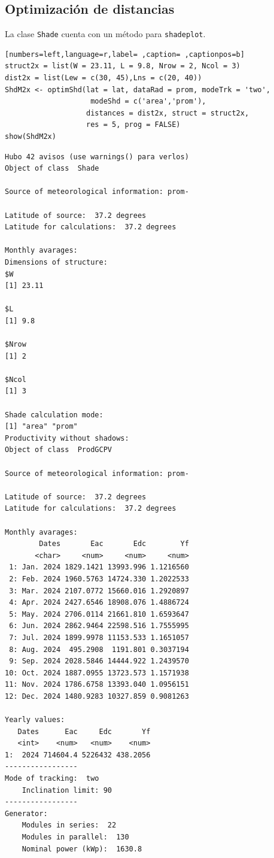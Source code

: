 \subsection{Optimización de distancias}
\label{sec:org7e88415}
La clase \texttt{Shade} cuenta con un método para \texttt{shadeplot}.
\begin{lstlisting}[numbers=left,language=r,label= ,caption= ,captionpos=b]
struct2x = list(W = 23.11, L = 9.8, Nrow = 2, Ncol = 3)
dist2x = list(Lew = c(30, 45),Lns = c(20, 40))
ShdM2x <- optimShd(lat = lat, dataRad = prom, modeTrk = 'two',
                    modeShd = c('area','prom'),
                   distances = dist2x, struct = struct2x,
                   res = 5, prog = FALSE)
show(ShdM2x)
\end{lstlisting}

\begin{verbatim}
Hubo 42 avisos (use warnings() para verlos)
Object of class  Shade 

Source of meteorological information: prom- 

Latitude of source:  37.2 degrees
Latitude for calculations:  37.2 degrees

Monthly avarages:
Dimensions of structure:
$W
[1] 23.11

$L
[1] 9.8

$Nrow
[1] 2

$Ncol
[1] 3

Shade calculation mode:
[1] "area" "prom"
Productivity without shadows:
Object of class  ProdGCPV 

Source of meteorological information: prom- 

Latitude of source:  37.2 degrees
Latitude for calculations:  37.2 degrees

Monthly avarages:
        Dates       Eac       Edc        Yf
       <char>     <num>     <num>     <num>
 1: Jan. 2024 1829.1421 13993.996 1.1216560
 2: Feb. 2024 1960.5763 14724.330 1.2022533
 3: Mar. 2024 2107.0772 15660.016 1.2920897
 4: Apr. 2024 2427.6546 18908.076 1.4886724
 5: May. 2024 2706.0114 21661.810 1.6593647
 6: Jun. 2024 2862.9464 22598.516 1.7555995
 7: Jul. 2024 1899.9978 11153.533 1.1651057
 8: Aug. 2024  495.2908  1191.801 0.3037194
 9: Sep. 2024 2028.5846 14444.922 1.2439570
10: Oct. 2024 1887.0955 13723.573 1.1571938
11: Nov. 2024 1786.6758 13393.040 1.0956151
12: Dec. 2024 1480.9283 10327.859 0.9081263

Yearly values:
   Dates      Eac     Edc       Yf
   <int>    <num>   <num>    <num>
1:  2024 714604.4 5226432 438.2056
-----------------
Mode of tracking:  two 
    Inclination limit: 90 
-----------------
Generator:
    Modules in series:  22 
    Modules in parallel:  130 
    Nominal power (kWp):  1630.8 


\end{verbatim}
